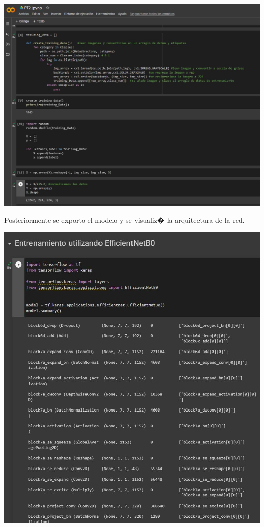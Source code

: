 \documentclass[12pt,letterpaper]{article}
\begin{document}
\begin{center}
  \includegraphics[scale=0.4]{imagenes/pdata}
 \label{fig:Data} 
\end{center} 


Posteriormente se exporto el modelo y se visualiz� la arquitectura de la red.

\begin{center}
  \includegraphics[scale=0.4]{imagenes/effnet.JPG}
 \label{fig:MMobileNet} 
\end{center} 
\end{document}
